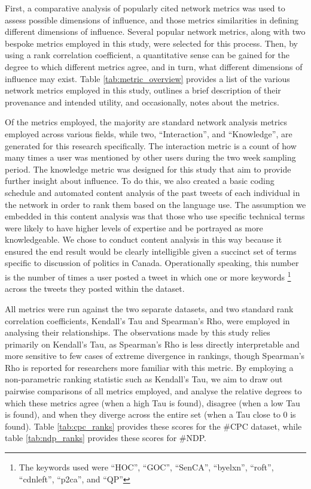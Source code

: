 \documentclass[a4paper,12pt]{article}
\begin{document}
First, a comparative analysis of popularly cited network metrics was used to assess possible dimensions of influence, and those metrics similarities in defining different dimensions of influence. Several popular network metrics, along with two bespoke metrics employed in this study, were selected for this process. Then, by using a rank correlation coefficient, a quantitative sense can be gained for the degree to which different metrics agree, and in turn, what different dimensions of influence may exist. Table \ref{tab:metric_overview} provides a list of the various network metrics employed in this study, outlines a brief description of their provenance and intended utility, and occasionally, notes about the metrics. 

Of the metrics employed, the majority are standard network analysis metrics employed across various fields, while two, ``Interaction'', and ``Knowledge'', are generated for this research specifically. The interaction metric is a count of how many times a user was mentioned by other users during the two week sampling period. The knowledge metric was designed for this study that aim to provide further insight about influence. To do this, we also created a basic coding schedule and automated content analysis of the past tweets of each individual in the network in order to rank them based on the language use. The assumption we embedded in this content analysis was that those who use specific technical terms were likely to have higher levels of expertise and be portrayed as more knowledgeable. We chose to conduct content analysis in this way because it ensured the end result would be clearly intelligible given a succinct set of terms specific to discussion of politics in Canada. Operationally speaking, this number is the number of times a user posted a tweet in which one or more keywords \footnote{The keywords used were ``HOC'', ``GOC'', ``SenCA'', ``byelxn'', ``roft'', ``cdnleft'', ``p2ca'', and ``QP''} across the tweets they posted within the dataset.

All metrics were run against the two separate datasets, and two standard rank correlation coefficients, Kendall's Tau and Spearman's Rho, were employed in analysing their relationships. The observations made by this study relies primarily on Kendall's Tau, as Spearman's Rho is less directly interpretable and more sensitive to few cases of extreme divergence in rankings, though Spearman's Rho is reported for researchers more familiar with this metric. By employing a non-parametric ranking statistic such as Kendall's Tau, we aim to draw out pairwise comparisons of all metrics employed, and analyse the relative degrees to which these metrics agree (when a high Tau is found), disagree (when a low Tau is found), and when they diverge across the entire set (when a Tau close to 0 is found). Table \ref{tab:cpc_ranks} provides these scores for the \#CPC dataset, while table \ref{tab:ndp_ranks} provides these scores for \#NDP.
\end{document}
